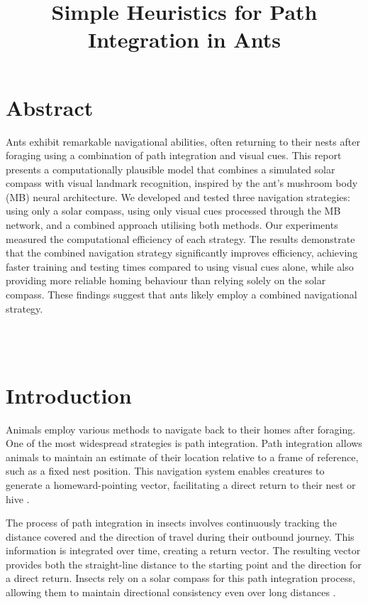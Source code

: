 \documentclass[12pt,a4paper]{article}
\title{Simple Heuristics for Path Integration in Ants}
\author{}
\begin{document}
\maketitle

\section*{Abstract}

Ants exhibit remarkable navigational abilities, often returning to their nests after foraging using a combination of path integration and visual cues. This report presents a computationally plausible model that combines a simulated solar compass with visual landmark recognition, inspired by the ant's mushroom body (MB) neural architecture. We developed and tested three navigation strategies: using only a solar compass, using only visual cues processed through the MB network, and a combined approach utilising both methods. Our experiments measured the computational efficiency of each strategy. The results demonstrate that the combined navigation strategy significantly improves efficiency, achieving faster training and testing times compared to using visual cues alone, while also providing more reliable homing behaviour than relying solely on the solar compass. These findings suggest that ants likely employ a combined navigational strategy.

\\~\\
\section{Introduction}

Animals employ various methods to navigate back to their homes after foraging. One of the most widespread strategies is path integration. Path integration allows animals to maintain an estimate of their location relative to a frame of reference, such as a fixed nest position. This navigation system enables creatures to generate a homeward-pointing vector, facilitating a direct return to their nest or hive \cite{wehner_2008}.

The process of path integration in insects involves continuously tracking the distance covered and the direction of travel during their outbound journey. This information is integrated over time, creating a return vector. The resulting vector provides both the straight-line distance to the starting point and the direction for a direct return. Insects rely on a solar compass for this path integration process, allowing them to maintain directional consistency even over long distances \cite{wehner_2008}.
\end{document}
